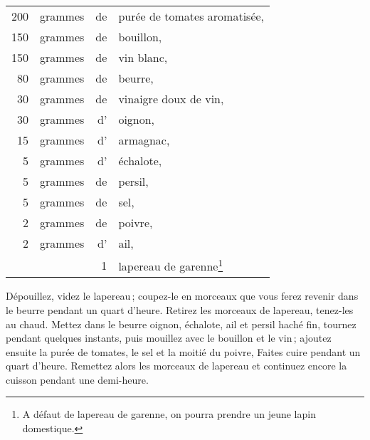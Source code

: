 \footnotesize
\begin{longtable}{rrrp{16em}}
    200 & grammes & de & purée de tomates aromatisée,                                                     \\
    150 & grammes & de & bouillon,                                                                        \\
    150 & grammes & de & vin blanc,                                                                       \\
     80 & grammes & de & beurre,                                                                          \\
     30 & grammes & de & vinaigre doux de vin,                                                            \\
     30 & grammes & d' & oignon,                                                                          \\
     15 & grammes & d' & armagnac,                                                                        \\
      5 & grammes & d’ & échalote,                                                                        \\
      5 & grammes & de & persil,                                                                          \\
      5 & grammes & de & sel,                                                                             \\
      2 & grammes & de & poivre,                                                                          \\
      2 & grammes & d' & ail,                                                                             \\
        &         &  1 & lapereau de garenne\footnote{A défaut de lapereau de garenne,
                         on pourra prendre un jeune lapin domestique.}                                    \\
\end{longtable}
\normalsize

Dépouillez, videz le lapereau ; coupez-le en morceaux que vous ferez revenir
dans le beurre pendant un quart d'heure. Retirez les morceaux de lapereau,
tenez-les au chaud. Mettez dans le beurre oignon, échalote, ail et persil haché
fin, tournez pendant quelques instants, puis mouillez avec le bouillon et le
vin ; ajoutez ensuite la purée de tomates, le sel et la moitié du poivre,
Faites cuire pendant un quart d'heure. Remettez alors les morceaux de lapereau
et continuez encore la cuisson pendant une demi-heure.

